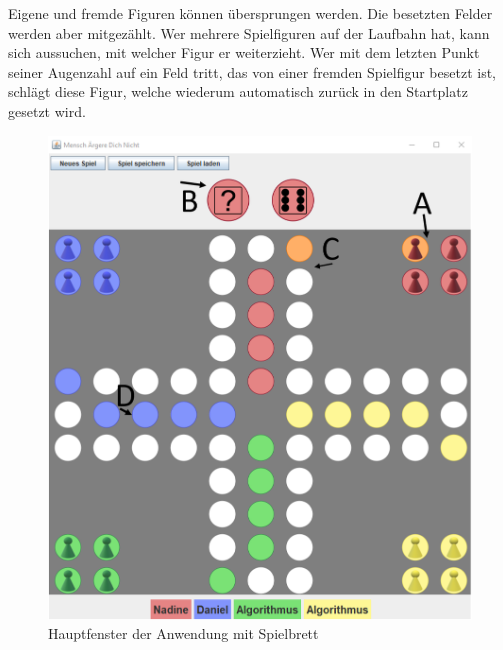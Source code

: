 Eigene und fremde Figuren können übersprungen werden. Die besetzten Felder werden aber mitgezählt. Wer mehrere Spielfiguren auf der Laufbahn hat, kann sich aussuchen, mit welcher Figur er weiterzieht. Wer mit dem letzten Punkt seiner Augenzahl auf ein Feld tritt, das von einer fremden Spielfigur besetzt ist, schlägt diese Figur, welche wiederum automatisch zurück in den Startplatz gesetzt wird. 

\begin{figure}[htbp]
\centering
\centerline{\includegraphics[scale=.6]{anleitung5}}
\caption{Hauptfenster der Anwendung mit Spielbrett}
\label{fig:anleitung5}
\end{figure}

  
